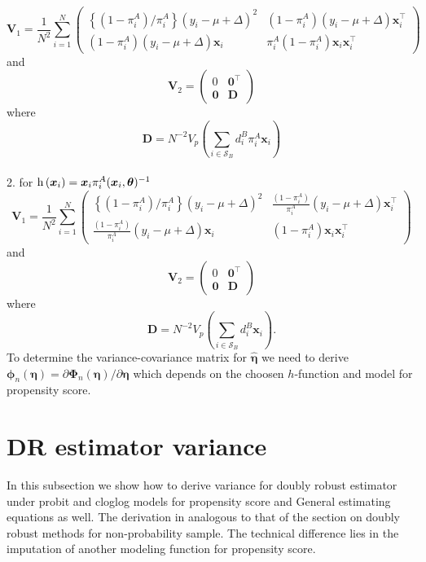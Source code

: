 \documentclass[
  letterpaper,
  DIV=11,
  numbers=noendperiod]{scrreprt}
\begin{document}
\[
\mathbf{V}_1=\frac{1}{N^2} \sum_{i=1}^N\left(\begin{array}{cc}
\left\{\left(1-\pi_i^A\right) / \pi_i^A\right\}\left(y_i-\mu+\Delta\right)^2 & \left(1-\pi_i^A\right)\left(y_i-\mu+\Delta\right) \boldsymbol{x}_i^{\top} \\
\left(1-\pi_i^A\right)\left(y_i-\mu+\Delta\right) \boldsymbol{x}_i & \pi_i^A\left(1-\pi_i^A\right) \boldsymbol{x}_i \boldsymbol{x}_i^{\top}
\end{array}\right)
\] and \[
\mathbf{V}_2=\left(\begin{array}{cc}
0 & \mathbf{0}^{\top} \\
\mathbf{0} & \mathbf{D}
\end{array}\right)
\] where
\[\mathbf{D}=N^{-2} V_p\left(\sum_{i \in \mathcal{S}_B} d_i^B \pi_i^A \boldsymbol{x}_i\right)\]\\
2. for
\(\operatorname{h}\left(\boldsymbol{x}_i\right) = \boldsymbol{x}_i \pi_i^A(\boldsymbol{x}_i, \boldsymbol{\theta}) ^{-1}\)
\[
\mathbf{V}_1=\frac{1}{N^2} \sum_{i=1}^N\left(\begin{array}{cc}
\left\{\left(1-\pi_i^A\right) / \pi_i^A\right\}\left(y_i-\mu+\Delta\right)^2 & \frac{\left(1-\pi_i^A\right)}{\pi_i^A}\left(y_i-\mu+\Delta\right) \boldsymbol{x}_i^{\top} \\
\frac{\left(1-\pi_i^A\right)}{\pi_i^A}\left(y_i-\mu+\Delta\right) \boldsymbol{x}_i & \left(1-\pi_i^A\right) \boldsymbol{x}_i \boldsymbol{x}_i^{\top}
\end{array}\right)
\] and \[
\mathbf{V}_2=\left(\begin{array}{cc}
0 & \mathbf{0}^{\top} \\
\mathbf{0} & \mathbf{D}
\end{array}\right)
\] where
\[\mathbf{D}=N^{-2} V_p\left(\sum_{i \in \mathcal{S}_B} d_i^B \boldsymbol{x}_i\right).\]
To determine the variance-covariance matrix for
\(\hat{\boldsymbol{\eta}}\) we need to derive
\(\boldsymbol{\phi}_n(\boldsymbol{\eta})=\partial \boldsymbol{\Phi}_n(\boldsymbol{\eta}) / \partial \boldsymbol{\eta}\)
which depends on the choosen \(h\)-function and model for propensity
score.

\hypertarget{dr-estimator-variance}{%
\section{DR estimator variance}\label{dr-estimator-variance}}

In this subsection we show how to derive variance for doubly robust
estimator under probit and cloglog models for propensity score and
General estimating equations as well. The derivation in analogous to
that of the section on doubly robust methods for non-probability sample.
The technical difference lies in the imputation of another modeling
function for propensity score.
\end{document}
